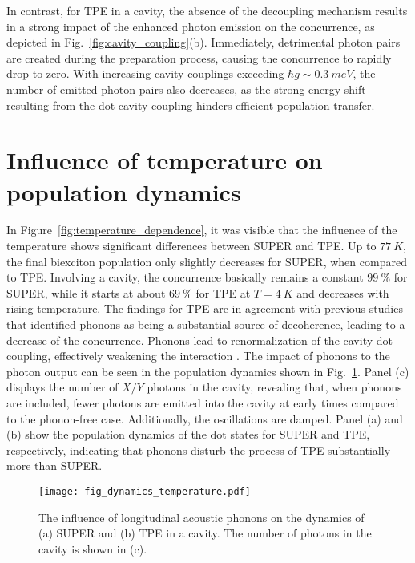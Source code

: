 \documentclass[%
 reprint,superscriptaddress,
 amsmath,amssymb,
 aps]{revtex4-2}
\begin{document}
In contrast, for TPE in a cavity, the absence of the decoupling mechanism results in a strong impact of the enhanced photon emission on the concurrence, as depicted in Fig.~\ref{fig:cavity_coupling}(b). Immediately, detrimental photon pairs are created during the preparation process, causing the concurrence to rapidly drop to zero. With increasing cavity couplings exceeding $\hbar g \sim \SI{0.3}{meV}$, the number of emitted photon pairs also decreases, as the strong energy shift resulting from the dot-cavity coupling hinders efficient population transfer.

\section{Influence of temperature on population dynamics}
In Figure~\ref{fig:temperature_dependence}, it was visible that the influence of the temperature shows significant differences between SUPER and TPE. Up to $\SI{77}{K}$, the final biexciton population only slightly decreases for SUPER, when compared to TPE. Involving a cavity, the concurrence basically remains a constant $\SI{99}{\percent}$ for SUPER, while it starts at about $\SI{69}{\percent}$ for TPE at $T=\SI{4}{K}$ and decreases with rising temperature. The findings for TPE are in agreement with previous studies \cite{heinze2017polarization,seidelmann2019phonon} that identified phonons as being a substantial source of decoherence, leading to a decrease of the concurrence. Phonons lead to renormalization of the cavity-dot coupling, effectively weakening the interaction \cite{seidelmann2019phonon}. The impact of phonons to the photon output can be seen in the population dynamics shown in Fig.~\ref{fig:cavity_phonons}. Panel (c) displays the number of $X/Y$ photons in the cavity, revealing that, when phonons are included, fewer photons are emitted into the cavity at early times compared to the phonon-free case. Additionally, the oscillations are damped. Panel (a) and (b) show the population dynamics of the dot states for SUPER and TPE, respectively, indicating that phonons disturb the process of TPE substantially more than SUPER.\\
\begin{figure}[thb]
    \centering
    \texttt{[image: fig\_dynamics\_temperature.pdf]}
    \caption{The influence of longitudinal acoustic phonons on the dynamics of (a) SUPER and (b) TPE in a cavity. The number of photons in the cavity is shown in (c).}
    \label{fig:cavity_phonons}
\end{figure}
\end{document}
